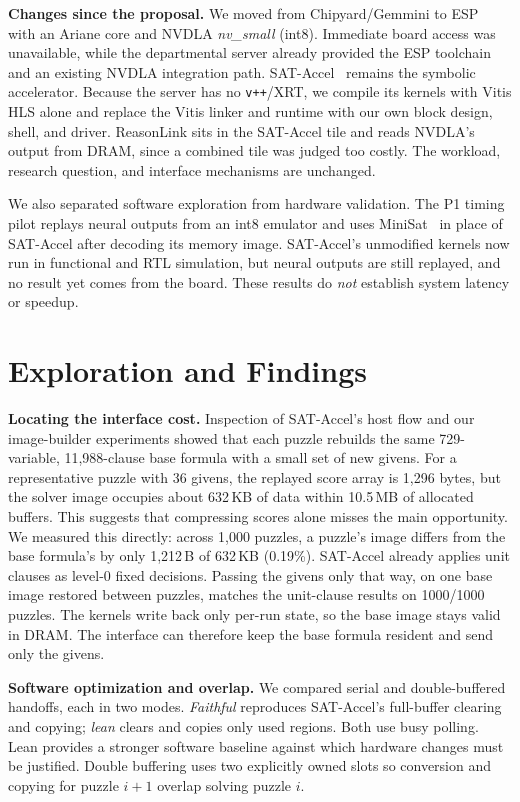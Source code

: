 \documentclass[conference,10pt,letterpaper]{IEEEtran}
\begin{document}
\textbf{Changes since the proposal.} We moved from Chipyard/Gemmini to ESP~\cite{esp} with an Ariane core and NVDLA \emph{nv\_small} (int8). Immediate board access was unavailable, while the departmental server already provided the ESP toolchain and an existing NVDLA integration path. SAT-Accel~\cite{sataccel} remains the symbolic accelerator. Because the server has no \texttt{v++}/XRT, we compile its kernels with Vitis HLS alone and replace the Vitis linker and runtime with our own block design, shell, and driver. ReasonLink sits in the SAT-Accel tile and reads NVDLA's output from DRAM, since a combined tile was judged too costly. The workload, research question, and interface mechanisms are unchanged.

We also separated software exploration from hardware validation. The P1 timing pilot replays neural outputs from an int8 emulator and uses MiniSat~\cite{minisat} in place of SAT-Accel after decoding its memory image. SAT-Accel's unmodified kernels now run in functional and RTL simulation, but neural outputs are still replayed, and no result yet comes from the board. These results do \emph{not} establish system latency or speedup.

\section{Exploration and Findings}
\textbf{Locating the interface cost.} Inspection of SAT-Accel's host flow and our image-builder experiments showed that each puzzle rebuilds the same 729-variable, 11,988-clause base formula with a small set of new givens. For a representative puzzle with 36 givens, the replayed score array is 1,296 bytes, but the solver image occupies about 632\,KB of data within 10.5\,MB of allocated buffers. This suggests that compressing scores alone misses the main opportunity. We measured this directly: across 1,000 puzzles, a puzzle's image differs from the base formula's by only 1,212\,B of 632\,KB (0.19\%). SAT-Accel already applies unit clauses as level-0 fixed decisions. Passing the givens only that way, on one base image restored between puzzles, matches the unit-clause results on 1000/1000 puzzles. The kernels write back only per-run state, so the base image stays valid in DRAM. The interface can therefore keep the base formula resident and send only the givens.

\textbf{Software optimization and overlap.} We compared serial and double-buffered handoffs, each in two modes. \emph{Faithful} reproduces SAT-Accel's full-buffer clearing and copying; \emph{lean} clears and copies only used regions. Both use busy polling. Lean provides a stronger software baseline against which hardware changes must be justified. Double buffering uses two explicitly owned slots so conversion and copying for puzzle $i{+}1$ overlap solving puzzle $i$.
\end{document}

